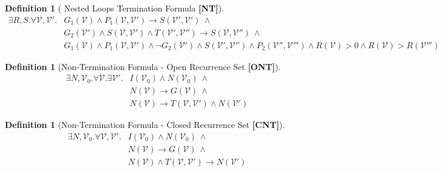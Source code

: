\documentclass[preprint]{sigplanconf}
\theoremstyle{definition}
\newtheorem{definition}[theorem]{Definition}
\begin{document}
\begin{figure*}
\begin{framed}
\begin{definition}[ Nested Loops Termination Formula {\bf [NT]}]
\label{def:deterministic-nonterm-formula}
 \begin{align*}
  \exists R, S . \forall \mathcal{V}, \mathcal{V}' . & G_1(\mathcal{V}) \wedge P_1(\mathcal{V},\mathcal{V}') \rightarrow S(\mathcal{V}',\mathcal{V}') ~ \wedge \\
                                & G_2(\mathcal{V}') \wedge S(\mathcal{V},\mathcal{V}') \wedge T(\mathcal{V}',\mathcal{V}'')\rightarrow S(\mathcal{V},\mathcal{V}'') ~ \wedge \\
				& G_1(\mathcal{V}) \wedge P_1(\mathcal{V},\mathcal{V}') \wedge \neg G_2(\mathcal{V}') \wedge S(\mathcal{V}',\mathcal{V}'') \wedge 
                                P_2(\mathcal{V}'',\mathcal{V}''') \wedge 
                                  R(\mathcal{V}) > 0 \wedge R(\mathcal{V}) > R(\mathcal{V}''') 
 \end{align*} 
\end{definition}


\begin{definition}[Non-Termination Formula - Open Recurrence Set  {\bf [ONT]}]
\label{def:nonterm-formula}
 \begin{align*}
  \exists N, \mathcal{V}_0 . \forall \mathcal{V} . \exists \mathcal{V}' . & I(\mathcal{V}_0) \wedge N(\mathcal{V}_0) ~ \wedge \\
                                                        & N(\mathcal{V}) \rightarrow G(\mathcal{V}) ~ \wedge \\
							& N(\mathcal{V}) \rightarrow T(\mathcal{V}, \mathcal{V}') \wedge N(\mathcal{V}') 
 \end{align*}
\end{definition}

\begin{definition}[Non-Termination Formula - Closed Recurrence Set {\bf [CNT]}]
\label{def:deterministic-nonterm-formula}
 \begin{align*}
  \exists N, \mathcal{V}_0 . \forall \mathcal{V}, \mathcal{V}' . & I(\mathcal{V}_0) \wedge N(\mathcal{V}_0) ~ \wedge \\
                                                        & N(\mathcal{V}) \rightarrow G(\mathcal{V}) ~ \wedge \\
							& N(\mathcal{V}) \wedge T(\mathcal{V}, \mathcal{V}') \rightarrow N(\mathcal{V}') 
 \end{align*} 
\end{definition}


\end{framed}
\end{figure*}
\end{document}

